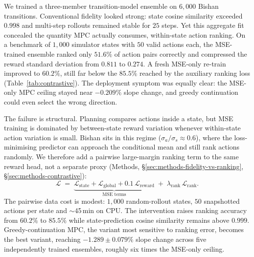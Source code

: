 \documentclass[11pt]{article}
\begin{document}
We trained a three-member transition-model ensemble on $6{,}000$ Bishan transitions. Conventional fidelity looked strong: state cosine similarity exceeded $0.998$ and multi-step rollouts remained stable for $25$ steps. Yet this aggregate fit concealed the quantity MPC actually consumes, within-state action ranking. On a benchmark of $1{,}000$ simulator states with $50$ valid actions each, the MSE-trained ensemble ranked only $51.6\%$ of action pairs correctly and compressed the reward standard deviation from $0.811$ to $0.274$. A fresh MSE-only re-train improved to $60.2\%$, still far below the $85.5\%$ reached by the auxiliary ranking loss (Table~\ref{tab:contrastive}). The deployment symptom was equally clear: the MSE-only MPC ceiling stayed near $-0.209\%$ slope change, and greedy continuation could even select the wrong direction.

The failure is structural. Planning compares actions inside a state, but MSE training is dominated by between-state reward variation whenever within-state action variation is small. Bishan sits in this regime ($\sigma_a/\sigma_s \approx 0.6$), where the loss-minimising predictor can approach the conditional mean and still rank actions randomly. We therefore add a pairwise large-margin ranking term \citep{herbrich2000large,joachims2002optimizing,burges2005learning,burges2010ranknet} to the same reward head, not a separate proxy (Methods, \S\ref{sec:methods-fidelity-vs-ranking}, \S\ref{sec:methods-contrastive}):
\begin{equation}
\mathcal{L} \;=\; \underbrace{\mathcal{L}_{\text{state}} + \mathcal{L}_{\text{global}} + 0.1\,\mathcal{L}_{\text{reward}}}_{\text{MSE terms}} \;+\; \lambda_{\text{rank}}\,\mathcal{L}_{\text{rank}}.
\end{equation}
The pairwise data cost is modest: $1{,}000$ random-rollout states, $50$ snapshotted actions per state and $\sim$45\,min on CPU. The intervention raises ranking accuracy from $60.2\%$ to $85.5\%$ while state-prediction cosine similarity remains above $0.999$. Greedy-continuation MPC, the variant most sensitive to ranking error, becomes the best variant, reaching $-1.289 \pm 0.079\%$ slope change across five independently trained ensembles, roughly six times the MSE-only ceiling.
\end{document}
